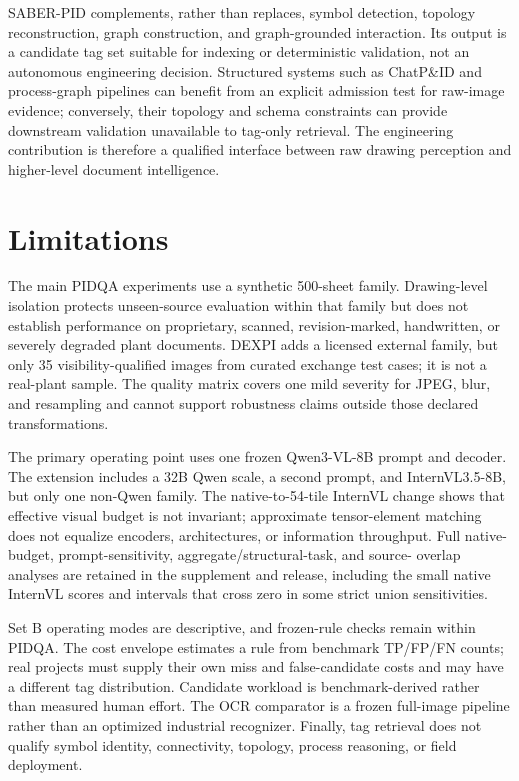 \documentclass[11pt]{article}
\begin{document}
SABER-PID complements, rather than replaces, symbol detection, topology
reconstruction, graph construction, and graph-grounded interaction. Its
output is a candidate tag set suitable for indexing or deterministic
validation, not an autonomous engineering decision. Structured systems such
as ChatP\&ID and process-graph pipelines can benefit from an explicit admission
test for raw-image evidence; conversely, their topology and schema constraints
can provide downstream validation unavailable to tag-only retrieval. The
engineering contribution is therefore a qualified interface between raw
drawing perception and higher-level document intelligence.

\section{Limitations}

The main PIDQA experiments use a synthetic 500-sheet family. Drawing-level
isolation protects unseen-source evaluation within that family but does not
establish performance on proprietary, scanned, revision-marked, handwritten,
or severely degraded plant documents. DEXPI adds a licensed external family,
but only 35 visibility-qualified images from curated exchange test cases; it
is not a real-plant sample. The quality matrix covers one mild severity for
JPEG, blur, and resampling and cannot support robustness claims outside those
declared transformations.

The primary operating point uses one frozen Qwen3-VL-8B prompt and decoder.
The extension includes a 32B Qwen scale, a second prompt, and InternVL3.5-8B,
but only one non-Qwen family. The native-to-54-tile InternVL change shows that
effective visual budget is not invariant; approximate tensor-element matching
does not equalize encoders, architectures, or information throughput. Full
native-budget, prompt-sensitivity, aggregate/structural-task, and source-
overlap analyses are retained in the supplement and release, including the
small native InternVL scores and intervals that cross zero in some strict
union sensitivities.

Set B operating modes are descriptive, and frozen-rule checks remain within
PIDQA. The cost envelope estimates a rule from benchmark TP/FP/FN counts; real
projects must supply their own miss and false-candidate costs and may have a
different tag distribution. Candidate workload is benchmark-derived rather
than measured human effort. The OCR comparator is a frozen full-image pipeline
rather than an optimized industrial recognizer. Finally, tag retrieval does
not qualify symbol identity, connectivity, topology, process reasoning, or
field deployment.
\end{document}
